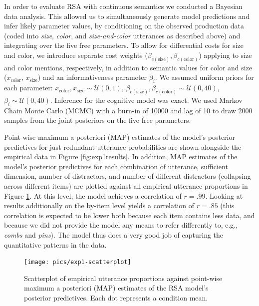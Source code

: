 \documentclass[11pt]{article}
\newcommand{\figref}[1]{Figure \ref{#1}}
\begin{document}
In order to evaluate RSA with continuous semantics we conducted a Bayesian data analysis.  This allowed us to  simultaneously generate model predictions and infer likely parameter values, by conditioning on the observed production data (coded into \emph{size}, \emph{color}, and \emph{size-and-color} utterances as described above) and integrating over the five free parameters. To allow for differential costs for size and color, we introduce separate cost weights ($\beta_{c(\textrm{size})}, \beta_{c(\textrm{color})}$) applying to size and color mentions, respectively, in addition to semantic values for color and size ($x_{\textrm{color}}$, $x_{\textrm{size}}$) and an informativeness parameter $\beta_i$. We assumed uniform priors for each parameter: $x_{\textrm{color}}, x_{\textrm{size}} \sim \mathcal{U}(0,1)$,  $\beta_{c(\textrm{size})}, \beta_{c(\textrm{color})} \sim \mathcal{U}(0,40)$, $\beta_i  \sim \mathcal{U}(0,40)$.
Inference for the cognitive model was exact. We used Markov Chain Monte Carlo (MCMC) with a burn-in of 10000 and lag of 10 to draw 2000 samples from the joint posteriors on the five free parameters.

Point-wise maximum a posteriori (MAP) estimates of the model's posterior predictives for just redundant utterance probabilities are shown alongside the empirical data in \figref{fig:exp1results}. In addition, MAP estimates of the model's posterior predictives for each combination of utterance, sufficient dimension, number of distractors, and number of different distractors (collapsing across different items) are plotted against all empirical utterance proportions in \figref{fig:exp1predictives}. At this level, the model achieves a correlation of $r = .99$. Looking at results additionally on the by-item level yields a correlation of $r = .85$ (this correlation is expected to be lower both because each item contains less data, and because we did not provide the model any means to refer differently to, e.g., \emph{combs} and \emph{pins}). The model thus does a very good job of capturing the quantitative patterns in the data. 

\begin{figure}
\centering
\texttt{[image: pics/exp1-scatterplot]}
\caption{Scatterplot of empirical utterance proportions against point-wise maximum a posteriori (MAP) estimates of the RSA model's posterior predictives. Each dot represents a condition mean.}
\label{fig:exp1predictives}
\end{figure}
\end{document}
